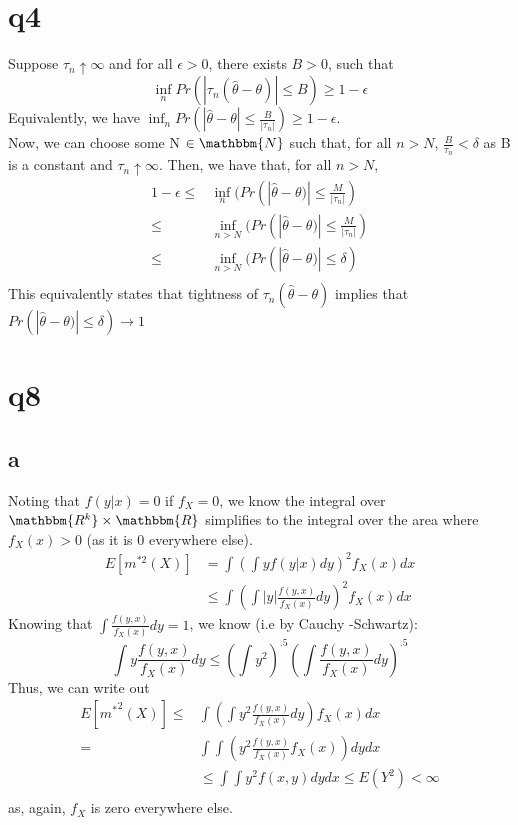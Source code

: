 \documentclass[12pt]{paper}
\begin{document}
\section*{q4}
Suppose $\tau_n \uparrow \infty$ and for all $\epsilon>0$, there exists $B>0$, such that $$\inf_n Pr(|\tau_n (\hat \theta - \theta)|\leq B) \geq 1-\epsilon $$
Equivalently, we have $\inf_n Pr(|\hat \theta - \theta|\leq \frac{B}{|\tau_n|}) \geq 1-\epsilon$. \\
Now, we can choose some N $\in \mathbbm{N}$ such that, for all $n>N$, $\frac{B}{\tau_n} < \delta $ as B is a constant and $\tau_n \uparrow \infty$. Then, we have that, for all $n>N$,
\begin{align*}
    1-\epsilon \leq & \inf_n(Pr(|\hat \theta - \theta)| \leq \frac{M}{|\tau_n|}) \\
    \leq & \inf_{n>N}(Pr(|\hat \theta - \theta)| \leq \frac{M}{|\tau_n|}) \\
    \leq & \inf_{n>N}(Pr(|\hat \theta - \theta)| \leq \delta) \\
\end{align*}
This equivalently states that tightness of $\tau_n (\hat \theta - \theta)$ implies that \\ $Pr(|\hat \theta - \theta)| \leq \delta) \rightarrow 1$
\section*{q8}
\subsection{a}
Noting that $f(y|x) = 0$ if $f_X = 0$, we know the integral over $\mathbbm{R^k}\times \mathbbm{R}$ simplifies to the integral over the area where $f_X(x)>0$ (as it is 0 everywhere else).
\begin{align*}
    E[m^{*2}(X)] &= \int (\int yf(y|x)dy)^2 f_X(x)dx \\
    & \leq \int (\int |y| \frac{f(y,x)}{f_X(x)}dy)^2 f_X(x)dx
\end{align*}
Knowing that $\int \frac{f(y,x)}{f_X(x)}dy = 1$, we know (i.e by Cauchy -Schwartz):
$$ \int y \frac{f(y,x)}{f_X(x)}dy \leq  (\int y^2)^{.5}(\int \frac{f(y,x)}{f_X(x)}dy)^{.5}$$
Thus, we can write out
\begin{align*}
    E[{m^*}^2(X)] \leq & \int (\int y^2 \frac{f(y,x)}{f_X(x)}dy)f_X(x)dx \\
    = & \int \int (y^2 \frac{f(y,x)}{f_X(x)}f_X(x))dy dx \\
    & \leq \int \int y^2 f(x,y) dy dx \leq E(Y^2) < \infty \\
\end{align*}
as, again, $f_X$ is zero everywhere else. 
\end{document}
